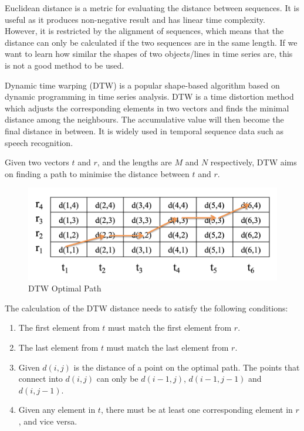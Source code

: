 \documentclass[11pt]{article} %
\theoremstyle{plain}
\theoremstyle{definition}
\begin{document}
Euclidean distance is a metric for evaluating the distance between sequences. It is useful as it produces non-negative result and has linear time complexity. However, it is restricted by the alignment of sequences, which means that the distance can only be calculated if the two sequences are in the same length. If we want to learn how similar the shapes of two objects/lines in time series are, this is not a good method to be used.

Dynamic time warping (DTW) is a popular shape-based algorithm based on dynamic programming in time series analysis. DTW is a time distortion method which adjusts the corresponding elements in two vectors and finds the minimal distance among the neighbours. The accumulative value will then become the final distance in between. It is widely used in temporal sequence data such as speech recognition\cite{aggarwal/data:2013}.

Given two vectors $t$ and $r$, and the lengths are $M$ and $N$ respectively, DTW aims on finding a path to minimise the distance between $t$ and $r$.

\begin{figure}[ht]
    \includegraphics[width=0.8\linewidth, center]{resources/DTW_path.png}
    \caption{DTW Optimal Path}
    \label{fig:dtwpath}
\end{figure}

The calculation of the DTW distance needs to satisfy the following conditions\cite{wiki/dtw:2018}:
{
  \begin{enumerate}
    \item The first element from $t$ must match the first element from $r$.
    \item The last element from $t$ must match the last element from $r$.
    \item Given $d(i,j)$ is the distance of a point on the optimal path. The points that connect into $d(i,j)$ can only be $d(i-1,j)$, $d(i-1,j-1)$ and $d(i,j-1)$.
    \item Given any element in $t$, there must be at least one corresponding element in $r$, and vice versa.
  \end{enumerate}
}
\end{document}
